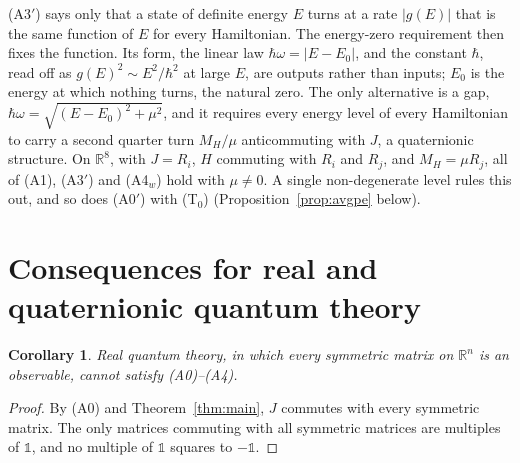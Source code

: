 \documentclass[11pt]{article}
\newtheorem{corollary}[theorem]{Corollary}
\theoremstyle{remark}
\newcommand{\R}{\mathbb{R}}
\newcommand{\one}{\mathbb{1}}
\begin{document}
(A3$'$) says only that a state of definite energy $E$ turns at a rate $|g(E)|$ that is the same function of $E$ for every Hamiltonian. The energy-zero requirement then fixes the function. Its form, the linear law $\hbar\omega=|E-E_0|$, and the constant $\hbar$, read off as $g(E)^2\sim E^2/\hbar^2$ at large $E$, are outputs rather than inputs; $E_0$ is the energy at which nothing turns, the natural zero. The only alternative is a gap, $\hbar\omega=\sqrt{(E-E_0)^2+\mu^2}$, and it requires every energy level of every Hamiltonian to carry a second quarter turn $M_H/\mu$ anticommuting with $J$, a quaternionic structure. On $\R^8$, with $J=R_i$, $H$ commuting with $R_i$ and $R_j$, and $M_H=\mu R_j$, all of (A1), (A3$'$) and (A4$_w$) hold with $\mu\neq0$. A single non-degenerate level rules this out, and so does (A0$'$) with (T$_0$) (Proposition~\ref{prop:avgpe} below).

\section{Consequences for real and quaternionic quantum theory}\label{sec:cons}

\begin{corollary}\label{cor:real}
Real quantum theory, in which every symmetric matrix on $\R^n$ is an observable, cannot satisfy (A0)--(A4).
\end{corollary}

\begin{proof}
By (A0) and Theorem~\ref{thm:main}, $J$ commutes with every symmetric matrix. The only matrices commuting with all symmetric matrices are multiples of $\one$, and no multiple of $\one$ squares to $-\one$.
\end{proof}
\end{document}
